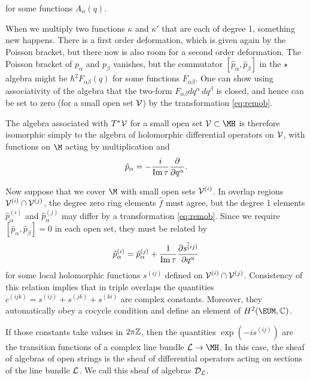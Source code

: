 for some functions $A_\alpha(q)$.

When we multiply two functions $\kappa$ and $\kappa'$ that are
each of degree 1, something new happens. There is a first order
deformation, which is given again by the Poisson bracket, but
there now is also room for a second order deformation.  The
Poisson bracket of $p_\alpha $ and $p_\beta$ vanishes, but the
commutator $[\hat p_\alpha,\hat p_\beta]$ in the $\star$ algebra
might be $\hbar^2 F_{\alpha\beta}(q)$ for some functions
$F_{\alpha\beta}$. One can show using associativity of the algebra
that the two-form $F_{\alpha\beta}dq^\alpha\,dq^\beta$ is closed,
and hence can be set to zero (for a small open set ${{\cal V}}$)
by the transformation \eqref{eq:remob}.

The algebra associated with $T^*{{\cal V}}$ for a small open set
${\cal V}\subset \MH$ is therefore isomorphic simply to the
algebra of holomorphic differential operators on ${{\cal V}}$,
with functions on $\M$ acting by multiplication and
\setcounter{equation}{14}
\begin{equation}\label{eq:mebolo}
\hat p_\alpha=-{i\over {\rm
Im}\,\tau}{\partial\over\partial q^\alpha}.
\end{equation}

Now suppose that we cover $\M$ with small open sets ${{\cal
V}}^{(i)}$.  In overlap regions ${{\cal V}}^{(i)}\cap {{\cal
V}}^{(j)}$, the degree zero ring elements $\hat f$ must agree, but
the degree 1 elements $\hat p_\alpha^{(i)}$ and $\hat
p_\alpha^{(j)}$ may differ by a transformation \eqref{eq:remob}.  Since we
require $[\hat p_\alpha,\hat p_\beta]=0$ in each open set, they
must be related by %
\setcounter{equation}{15}
\begin{equation}\label{eq:hecox}
\hat p_\alpha^{(i)}=\hat
p_\alpha^{(j)}+{1\over {\rm Im}\,\tau}\hat{\partial s^{(ij)}\over
\partial q^\alpha}
\end{equation}
 for some local holomorphic functions $s^{(ij)}$ defined on
${{\cal V}}^{(i)}\cap {{\cal V}}^{(j)}$.   Consistency of this
relation implies that in triple overlaps the quantities
$c^{(ijk)}=s^{(ij)}+s^{(jk)}+s^{(ki)}$ are complex constants.
Moreover, they automatically obey a cocycle condition and define
an element of $H^2({\EUM},\Bbb{C})$.

If those constants take values in $2\pi\Bbb{Z}$, then the
quantities $\exp(-is^{(ij)})$ are the transition functions of a
complex line bundle ${\cal L}\to \MH$.  In this case, the sheaf of
algebras of open strings is the sheaf of differential operators
acting on sections of the line bundle ${\cal L}$.  We call this
sheaf of algebras ${\cal D}_{\cal L}$.

